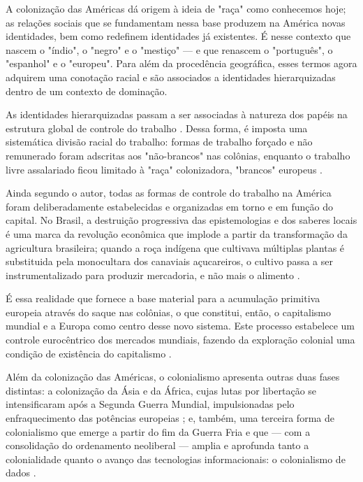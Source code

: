 A  colonização das Américas dá origem à ideia de "raça" como conhecemos hoje; as relações sociais que se fundamentam nessa base produzem na América novas identidades, bem como redefinem identidades já existentes. É nesse contexto que nascem o "índio", o "negro" e o "mestiço" — e que renascem o "português", o "espanhol" e o "europeu". Para além da procedência geográfica, esses termos agora adquirem uma conotação racial e são associados a identidades hierarquizadas dentro de um contexto de dominação.

As identidades hierarquizadas passam a ser associadas à natureza dos papéis na estrutura global de controle do trabalho \cite{quijano2005}. Dessa forma, é imposta uma sistemática divisão racial do trabalho: formas de trabalho forçado e não remunerado foram adscritas aos "não-brancos" nas colônias, enquanto o trabalho livre assalariado ficou limitado à "raça" colonizadora, "brancos" europeus \cite{quijano2005}. 

Ainda segundo o autor, todas as formas de controle do trabalho na América foram deliberadamente estabelecidas e organizadas em torno e em função do capital. No Brasil, a destruição progressiva das epistemologias e dos saberes locais é uma marca da revolução econômica que implode a partir da transformação da agricultura brasileira; quando a roça indígena que cultivava múltiplas plantas é substituida pela monocultara dos canaviais açucareiros, o cultivo passa a ser instrumentalizado para produzir mercadoria, e não mais o alimento \cite{Ribeiro_2007}.

É essa realidade que fornece a base material para a acumulação primitiva europeia através do saque nas colônias, o que constitui, então, o capitalismo mundial e a Europa como centro desse novo sistema. Este processo estabelece um controle eurocêntrico dos mercados mundiais, fazendo da exploração colonial uma condição de existência do capitalismo \cite{quijano2005}.

Além da colonização das Américas, o colonialismo apresenta outras duas fases distintas: a colonização da Ásia e da África, cujas lutas por libertação se intensificaram após a Segunda Guerra Mundial, impulsionadas pelo enfraquecimento das potências europeias \cite{beuron2024}; e, também, uma terceira forma de colonialismo que emerge a partir do fim da Guerra Fria e que — com a consolidação do ordenamento neoliberal — amplia e aprofunda tanto a colonialidade quanto o avanço das tecnologias informacionais: o colonialismo de dados \cite{beuron2024, Silveira2021}.

